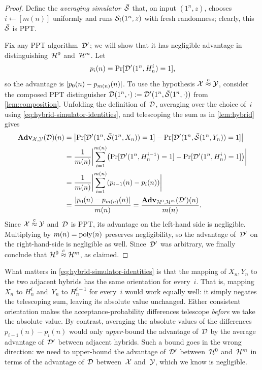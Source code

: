 \documentclass[11pt]{article}
\begin{document}
\begin{proof}
  Define the \emph{averaging simulator}~$\bar{\mathcal{S}}$ that, on input $(1^n,z)$, chooses $i\gets[m(n)]$ uniformly and runs $\mathcal{S}_i(1^n,z)$ with fresh randomness; clearly, this~$\bar{\mathcal{S}}$ is PPT\@.

  Fix any PPT algorithm~$\mathcal{D}'$; we will show that it has negligible advantage in distinguishing~$\mathcal{H}^0$ and~$\mathcal{H}^m$.
  Let \[ p_i(n)=\Pr[\mathcal{D}'(1^n,H^i_n)=1] \text, \] so the advantage is $\lvert p_0(n)-p_{m(n)}(n)\rvert$.
  To use the hypothesis $\mathcal{X}\stackrel{c}{\approx}\mathcal{Y}$, consider the composed PPT distinguisher $\mathcal{D}(1^n,\cdot):=\mathcal{D}'(1^n,\bar{\mathcal{S}}(1^n,\cdot))$ from \cref{lem:composition}.
  Unfolding the definition of~$\mathcal{D}$, averaging over the choice of~$i$ using \cref{eq:hybrid-simulator-identities}, and telescoping the sum as in \cref{lem:hybrid} gives
  \begin{align*}
    \advan_{\calX,\calY}(\Dist)(n)
    &=\abs*{\Pr[\Dist'(1^n,\bar{\Sim}(1^n,X_n))=1]-\Pr[\Dist'(1^n,\bar{\Sim}(1^n,Y_n))=1]} \\
    &=\frac{1}{m(n)}\abs[\bigg]{\sum_{i=1}^{m(n)}\parens*{\Pr[\Dist'(1^n,H^{i-1}_n)=1]-\Pr[\Dist'(1^n,H^i_n)=1]}} \\
    &=\frac{1}{m(n)}\abs[\bigg]{\sum_{i=1}^{m(n)}\parens{p_{i-1}(n)-p_i(n)}} \\
    &=\frac{\abs{p_0(n)-p_{m(n)}(n)}}{m(n)}
    =\frac{\advan_{\calH^0,\calH^m}(\Dist')(n)}{m(n)}\text.
  \end{align*}
  Since $\mathcal{X}\stackrel{c}{\approx}\mathcal{Y}$ and~$\mathcal{D}$ is PPT, its advantage on the left-hand side is negligible.
  Multiplying by $m(n)=\operatorname{poly}(n)$ preserves negligibility, so the advantage of~$\mathcal{D}'$ on the right-hand-side is negligible as well.
  Since~$\mathcal{D}'$ was arbitrary, we finally conclude that $\mathcal{H}^0\stackrel{c}{\approx}\mathcal{H}^m$, as claimed.
\end{proof}

What matters in \cref{eq:hybrid-simulator-identities} is that the mapping of $X_n,Y_n$ to the two adjacent hybrids has the same orientation for every~$i$.
That is, mapping~$X_n$ to $H^i_n$ and~$Y_n$ to $H^{i-1}_n$ for every~$i$ would work equally well: it simply negates the telescoping sum, leaving its absolute value unchanged.
Either consistent orientation makes the acceptance-probability differences telescope \emph{before} we take the absolute value.
By contrast, averaging the absolute values of the differences $p_{i-1}(n)-p_i(n)$ would only \emph{upper}-bound the advantage of~$\mathcal{D}$ by the average advantage of~$\mathcal{D}'$ between adjacent hybrids.
Such a bound goes in the wrong direction: we need to upper-bound the advantage of~$\mathcal{D}'$ between~$\mathcal{H}^0$ and~$\mathcal{H}^m$ in terms of the advantage of~$\mathcal{D}$ between~$\mathcal{X}$ and~$\mathcal{Y}$, which we know is negligible.
\end{document}
